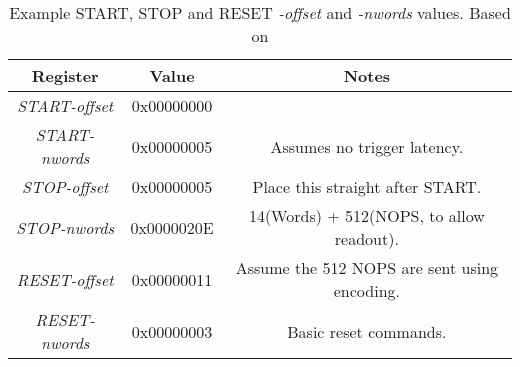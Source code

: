 \documentclass[]{article}
\begin{document}
    \begin{table}
        \begin{center}
        \begin{tabular}{c | c | c}
            Register            & Value      & Notes                                       \\
            \hline
            \emph{START-offset} & 0x00000000 &                                             \\
            \emph{START-nwords} & 0x00000005 & Assumes no trigger latency.                 \\
            \emph{STOP-offset}  & 0x00000005 & Place this straight after START.            \\
            \emph{STOP-nwords}  & 0x0000020E & 14(Words) + 512(NOPS, to allow readout).    \\
            \emph{RESET-offset} & 0x00000011 & Assume the 512 NOPS are sent using encoding.\\
            \emph{RESET-nwords} & 0x00000003 & Basic reset commands.                       \\
        \end{tabular}
        \end{center}
        \caption{Example START, STOP and RESET \emph{-offset} and \emph{-nwords} values. Based on \cite{LPD MANUAL}}
        \label{tab:basic_tx_control_reg}
    \end{table}

\end{document}
